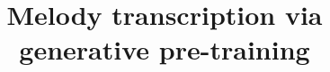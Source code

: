\documentclass{article}
\title{
Melody transcription via generative pre-training
}
\begin{document}
\maketitle

\begin{abstract}

\end{abstract}























\end{document}
